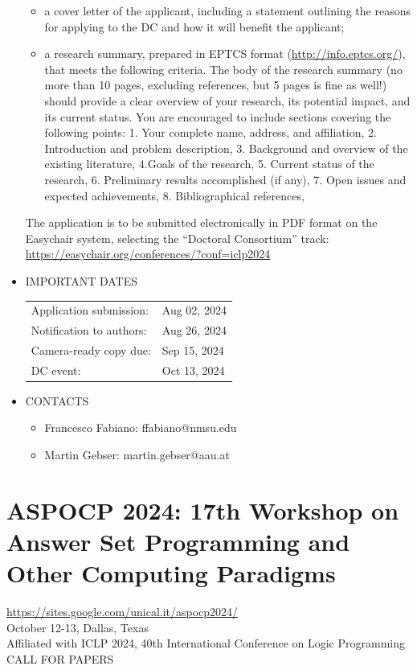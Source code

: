 \documentclass[prodmode,acmtecs]{acmsmall} %
\begin{document}
\begin{itemize}
\begin{itemize}\item  a cover letter of the applicant, including a statement outlining the reasons for applying to the DC and how it will benefit the applicant;
\item  a research summary, prepared in EPTCS format (\href{http://info.eptcs.org/}{http://info.eptcs.org/}), that meets the following criteria. The body of the research summary (no more than 10 pages, excluding references, but 5 pages is fine as well!) should provide a clear overview of your research, its potential impact, and its current status. You are encouraged to include sections covering the following points: 1. Your complete name, address, and affiliation, 2. Introduction and problem description, 3. Background and overview of the existing literature,  4.Goals of the research, 5. Current status of the research, 6. Preliminary results accomplished (if any), 7. Open issues and expected achievements, 8. Bibliographical references, 
\end{itemize} 
  The application is to be submitted electronically in PDF format on the Easychair system, selecting the “Doctoral Consortium” track: \href{https://easychair.org/conferences/?conf=iclp2024}{https://easychair.org/conferences/?conf=iclp2024} 
 
\item  IMPORTANT DATES  
 
\begin{tabulary}{\linewidth}{LL}Application submission:  & Aug 02, 2024 \\
Notification to authors:  & Aug 26, 2024 \\
Camera-ready copy due:  & Sep 15, 2024 \\
DC event:  & Oct 13, 2024 \\
\end{tabulary}
 
\item  CONTACTS  
 
\begin{itemize}\item  Francesco Fabiano: ffabiano@nmsu.edu
\item  Martin Gebser: martin.gebser@aau.at
\end{itemize} 
\end{itemize}\section{ASPOCP 2024: 17th Workshop on Answer Set Programming and Other Computing Paradigms}\label{ASPOCP2024}  \href{https://sites.google.com/unical.it/aspocp2024/}{https://sites.google.com/unical.it/aspocp2024/}    \\ 
  October 12-13, Dallas, Texas\\ 
  Affiliated with ICLP 2024, 40th International Conference on Logic Programming\\ 
CALL FOR PAPERS 
\end{document}
